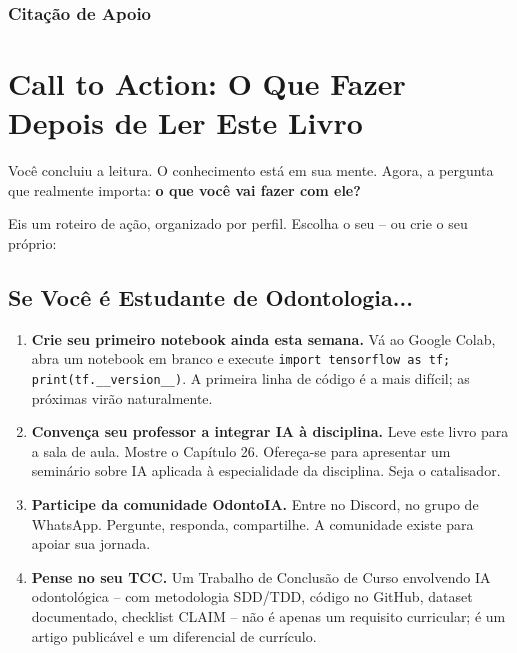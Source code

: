 \subsubsection{Citação de Apoio}


\section{Call to Action: O Que Fazer Depois de Ler Este Livro}
\label{sec:call-to-action}

\niveldois

Você concluiu a leitura. O conhecimento está em sua mente. Agora, a pergunta
que realmente importa: \textbf{o que você vai fazer com ele?}

Eis um roteiro de ação, organizado por perfil. Escolha o seu -- ou crie o seu
próprio:

\subsection{Se Você é Estudante de Odontologia...}

\begin{enumerate}
  \item \textbf{Crie seu primeiro notebook ainda esta semana.} Vá ao Google
    Colab, abra um notebook em branco e execute \texttt{import tensorflow as tf;
    print(tf.\_\_version\_\_)}. A primeira linha de código é a mais difícil; as
    próximas virão naturalmente.

  \item \textbf{Convença seu professor a integrar IA à disciplina.} Leve este
    livro para a sala de aula. Mostre o Capítulo 26. Ofereça-se para apresentar
    um seminário sobre IA aplicada à especialidade da disciplina. Seja o
    catalisador.

  \item \textbf{Participe da comunidade OdontoIA.} Entre no Discord, no grupo
    de WhatsApp. Pergunte, responda, compartilhe. A comunidade existe para
    apoiar sua jornada.

  \item \textbf{Pense no seu TCC.} Um Trabalho de Conclusão de Curso envolvendo
    IA odontológica -- com metodologia SDD/TDD, código no GitHub, dataset
    documentado, checklist CLAIM -- não é apenas um requisito curricular; é um
    artigo publicável e um diferencial de currículo.
\end{enumerate}

